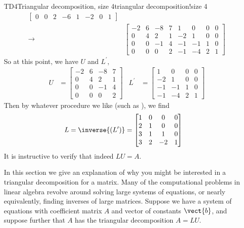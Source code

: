 \begin{example}{TD4}{Triangular decomposition, size 4}{triangular decomposition!size 4}
\begin{align*}
\begin{bmatrix}
 0 & 0 & 2 & -6 & 1 & -2 & 0 & 1
\end{bmatrix}\\
%
\rightarrow&
\begin{bmatrix}
 -2 & 6 & -8 & 7 & 1 & 0 & 0 & 0 \\
 0 & 4 & 2 & 1 & -2 & 1 & 0 & 0 \\
 0 & 0 & -1 & 4 & -1 & -1 & 1 & 0 \\
 0 & 0 & 0 & 2 & -1 & -4 & 2 & 1
\end{bmatrix}
%
\end{align*}
%
So at this point, we have $U$ and $L^\prime$,
%
\begin{align*}
%
U&=
\begin{bmatrix}
 -2 & 6 & -8 & 7 \\
 0 & 4 & 2 & 1 \\
 0 & 0 & -1 & 4  \\
 0 & 0 & 0 & 2
\end{bmatrix}
&
L^\prime&=
\begin{bmatrix}
 1 & 0 & 0 & 0 \\
 -2 & 1 & 0 & 0 \\
 -1 & -1 & 1 & 0\\
 -1 & -4 & 2 & 1
\end{bmatrix}
%
\end{align*}
%
Then by whatever procedure we like (such as ), we find
%
\begin{align*}
L&=\inverse{\left(L^\prime\right)}=
\begin{bmatrix}
 1 & 0 & 0 & 0 \\
 2 & 1 & 0 & 0 \\
 3 & 1 & 1 & 0 \\
 3 & 2 & -2 & 1
\end{bmatrix}
\end{align*}
%
It is instructive to verify that indeed $LU=A$.
%
\end{example}
%
%
In this section we give an explanation of why you might be interested in a triangular decomposition for a matrix.  Many of the computational problems in linear algebra revolve around solving large systems of equations, or nearly equivalently, finding inverses of large matrices.  Suppose we have a system of equations with coefficient matrix $A$ and vector of constants $\vect{b}$, and suppose further that $A$ has the triangular decomposition $A=LU$.\par
%
